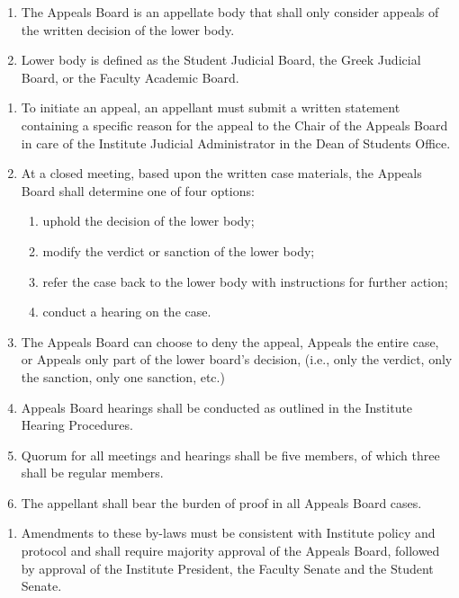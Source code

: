 \begin{enumerate}
    \item The Appeals Board is an appellate body that shall only consider appeals of the written decision of the lower body.
    \item Lower body is defined as the Student Judicial Board, the Greek Judicial Board, or the Faculty Academic Board.
\end{enumerate}

\begin{enumerate}
    \item To initiate an appeal, an appellant must submit a written statement containing a specific reason for the appeal to the Chair of the Appeals Board in care of the Institute Judicial Administrator in the Dean of Students Office.
    \item At a closed meeting, based upon the written case materials, the Appeals Board shall determine one of four options:
    \begin{enumerate}
        \item uphold the decision of the lower body;
        \item modify the verdict or sanction of the lower body;
        \item refer the case back to the lower body with instructions for further action;
        \item conduct a hearing on the case.
    \end{enumerate}
    \item The Appeals Board can choose to deny the appeal, Appeals the entire case, or Appeals only part of the lower board's decision, (i.e., only the verdict, only the sanction, only one sanction, etc.)
    \item Appeals Board hearings shall be conducted as outlined in the Institute Hearing Procedures.
    \item Quorum for all meetings and hearings shall be five members, of which three shall be regular members.
    \item The appellant shall bear the burden of proof in all Appeals Board cases.
\end{enumerate}

\begin{enumerate}
    \item Amendments to these by-laws must be consistent with Institute policy and protocol and shall require majority approval of the Appeals Board, followed by approval of the Institute President, the Faculty Senate and the Student Senate.
\end{enumerate}